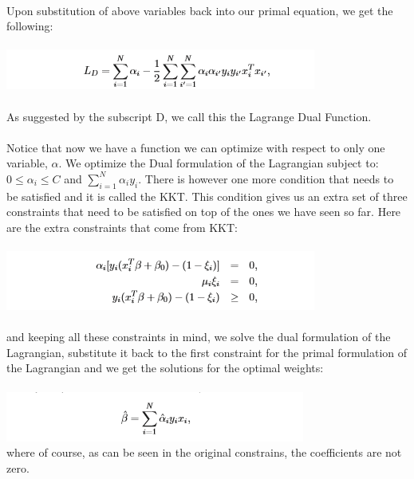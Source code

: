 \documentclass{article}
\begin{document}
\paragraph{}
Upon substitution of above variables back into our primal equation, we get the following:
\paragraph{}
\includegraphics[scale=1.2]{LagrangeDual.PNG}\\
\\
As suggested by the subscript D, we call this the Lagrange Dual Function.
\paragraph{}
Notice that now we have a function we can optimize with respect to only one variable, $\alpha$.
We optimize the Dual formulation of the Lagrangian subject to: $0 \leq \alpha_i \leq C$ and $\sum_{i=1}^{N}\alpha_iy_i$. There is however one more condition that needs to be satisfied and it is called the KKT. This condition gives us an extra set of three constraints that need to be satisfied on top of the ones we have seen so far. Here are the extra constraints that come from KKT:
\paragraph{}
\includegraphics[scale=1.2]{KKTconsraints.PNG}
\paragraph{}
and keeping all these constraints in mind, we solve the dual formulation of the Lagrangian, substitute it back to the first constraint for the primal formulation of the Lagrangian and we get the solutions for the optimal weights:\\
\\
\includegraphics[scale=1.4]{dualprimalsolutions.PNG}\\
where of course, as can be seen in the original constrains, the coefficients are not zero.
\end{document}
